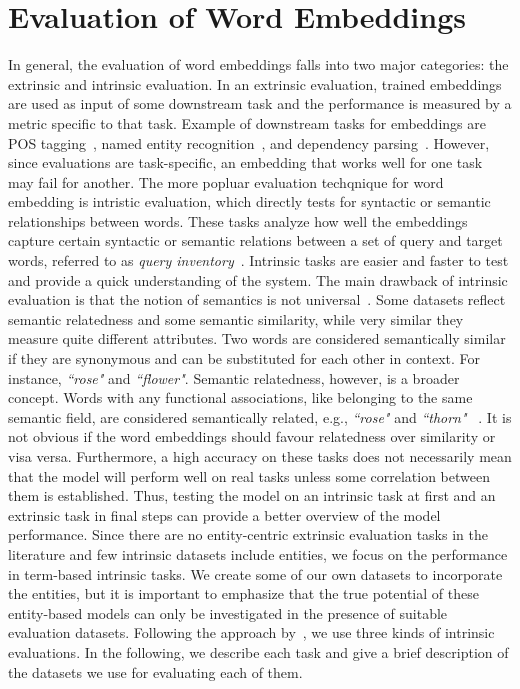 \section{Evaluation of Word Embeddings}\label{sec:eval_embeddings}
In general, the evaluation of word embeddings falls into two major categories: the extrinsic and intrinsic evaluation. In an extrinsic evaluation, trained embeddings are used as input of some downstream task and the performance is measured by a metric specific to that task. Example of downstream tasks for embeddings are POS tagging~, named entity recognition~, and dependency parsing~. However, since evaluations are task-specific, an embedding that works well for one task may fail for another. The more popluar evaluation techqnique for word embedding is intristic evaluation, which  directly tests for syntactic or semantic relationships between words. These tasks analyze how well the embeddings capture certain syntactic or semantic relations between a set of query and target words, referred to as \textit{query inventory}~. Intrinsic tasks are easier and faster to test and provide a quick understanding of the system. The main drawback of intrinsic evaluation is that the notion of semantics is not universal~. Some datasets reflect semantic relatedness and some semantic similarity, while very similar they measure quite different attributes. Two words are considered semantically similar if they are synonymous and can be substituted for each other in context. For instance, \emph{``rose"} and \emph{``flower"}. Semantic relatedness, however, is a broader concept. Words with any functional associations, like belonging to the same semantic field, are considered semantically related, e.g., \emph{``rose"} and \emph{``thorn"} ~. It is not obvious if the word embeddings should favour relatedness over similarity or visa versa. Furthermore, a high accuracy on these tasks does not necessarily mean that the model will perform well on real tasks unless some correlation between them is established. Thus, testing the model on an intrinsic task at first and an extrinsic task in final steps can provide a better overview of the model performance. Since there are no entity-centric extrinsic evaluation tasks in the literature and few intrinsic datasets include entities, we focus on the performance in term-based intrinsic tasks. We create some of our own datasets to incorporate the entities, but it is important to emphasize that the true potential of these entity-based models can only be investigated in the presence of suitable evaluation datasets. Following the approach by~, we use three kinds of intrinsic evaluations. In the following, we describe each task and give a brief description of the datasets we use for evaluating each of them. 
